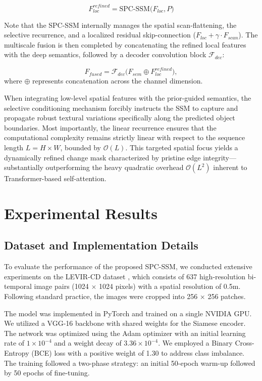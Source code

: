 \documentclass[10pt,conference]{IEEEtran}
\begin{document}
\begin{equation}
    F_{loc}^{refined} = \text{SPC-SSM}\big( F_{loc}, P \big)
\end{equation}

Note that the SPC-SSM internally manages the spatial scan-flattening, the selective recurrence, and a localized residual skip-connection ($F_{loc} + \gamma \cdot F_{scan}$). The multiscale fusion is then completed by concatenating the refined local features with the deep semantics, followed by a decoder convolution block $\mathcal{F}_{dec}$:

\begin{equation}
    F_{fused} = \mathcal{F}_{dec} \big( F_{sem} \oplus F_{loc}^{refined} \big),
\end{equation}
where $\oplus$ represents concatenation across the channel dimension.

When integrating low-level spatial features with the prior-guided semantics, the selective conditioning mechanism forcibly instructs the SSM to capture and propagate robust textural variations specifically along the predicted object boundaries. Most importantly, the linear recurrence ensures that the computational complexity remains strictly linear with respect to the sequence length $L=H \times W$, bounded by $\mathcal{O}(L)$. This targeted spatial focus yields a dynamically refined change mask characterized by pristine edge integrity—substantially outperforming the heavy quadratic overhead $\mathcal{O}(L^2)$ inherent to Transformer-based self-attention.



\section{Experimental Results}

\subsection{Dataset and Implementation Details}
To evaluate the performance of the proposed SPC-SSM, we conducted extensive experiments on the LEVIR-CD dataset \cite{chen2020spatial}, which consists of 637 high-resolution bi-temporal image pairs (1024 $\times$ 1024 pixels) with a spatial resolution of 0.5m. Following standard practice, the images were cropped into 256 $\times$ 256 patches.

The model was implemented in PyTorch and trained on a single NVIDIA GPU. We utilized a VGG-16 backbone with shared weights for the Siamese encoder. The network was optimized using the Adam optimizer with an initial learning rate of $1 \times 10^{-4}$ and a weight decay of $3.36 \times 10^{-4}$. We employed a Binary Cross-Entropy (BCE) loss with a positive weight of 1.30 to address class imbalance. The training followed a two-phase strategy: an initial 50-epoch warm-up followed by 50 epochs of fine-tuning.
\end{document}
